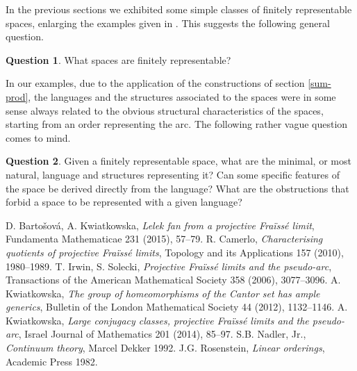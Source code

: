 \documentclass[12pt,twoside,a4paper]{amsart}
\theoremstyle{plain}
\theoremstyle{definition}
\newtheorem{question}{Question}
\begin{document}
In the previous sections we exhibited some simple classes of finitely representable spaces, enlarging the examples given in \cite{Camerl2010}.
This suggests the following general question.

\begin{question}
What spaces are finitely representable?
\end{question}

In our examples, due to the application of the constructions of section \ref{sum-prod}, the languages and the structures associated to the spaces were in some sense always related to the obvious structural characteristics of the spaces, starting from an order representing the arc.
The following rather vague question comes to mind.

\begin{question}
Given a finitely representable space, what are the minimal, or most natural, language and structures representing it?
Can some specific features of the space be derived directly from the language?
What are the obstructions that forbid a space to be represented with a given language?
\end{question}

\begin{thebibliography}{99}
 D. Barto\v{s}ov\'a, A. Kwiatkowska, {\it Lelek fan from a projective Fra\"iss\'e limit}, Fundamenta Mathematicae 231 (2015), 57--79.
 R. Camerlo, {\it Characterising quotients of projective Fra\"iss\'e limits}, Topology and its Applications 157 (2010), 1980--1989.
 T. Irwin, S. Solecki, {\it Projective Fra\"iss\'e limits and the pseudo-arc}, Transactions of the American Mathematical Society 358 (2006), 3077--3096.
 A. Kwiatkowska, {\it The group of homeomorphisms of the Cantor set has ample generics}, Bulletin of the London Mathematical Society 44 (2012), 1132--1146.
 A. Kwiatkowska, {\it Large conjugacy classes, projective Fra\"iss\'e limits and the pseudo-arc}, Israel Journal of Mathematics 201 (2014), 85--97.
 S.B. Nadler, Jr., {\it Continuum theory}, Marcel Dekker 1992.
 J.G. Rosenstein, {\it Linear orderings}, Academic Press 1982.
\end{thebibliography}
\end{document}
